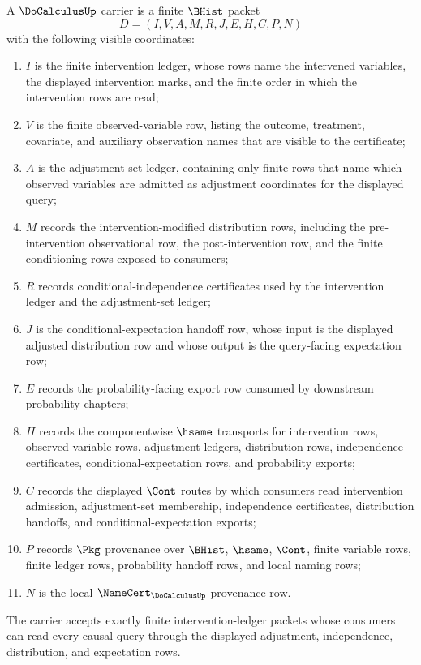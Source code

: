 \begin{definition}
\label{def:do-calculus-carrier}
A $\DoCalculusUp$ carrier is a finite $\BHist$ packet
$$
D=(I,V,A,M,R,J,E,H,C,P,N)
$$
with the following visible coordinates:
\begin{enumerate}
\item $I$ is the finite intervention ledger, whose rows name the intervened
variables, the displayed intervention marks, and the finite order in which the
intervention rows are read;
\item $V$ is the finite observed-variable row, listing the outcome, treatment,
covariate, and auxiliary observation names that are visible to the certificate;
\item $A$ is the adjustment-set ledger, containing only finite rows that name
which observed variables are admitted as adjustment coordinates for the
displayed query;
\item $M$ records the intervention-modified distribution rows, including the
pre-intervention observational row, the post-intervention row, and the finite
conditioning rows exposed to consumers;
\item $R$ records conditional-independence certificates used by the intervention
ledger and the adjustment-set ledger;
\item $J$ is the conditional-expectation handoff row, whose input is the
displayed adjusted distribution row and whose output is the query-facing
expectation row;
\item $E$ records the probability-facing export row consumed by downstream
probability chapters;
\item $H$ records the componentwise $\hsame$ transports for intervention rows,
observed-variable rows, adjustment ledgers, distribution rows, independence
certificates, conditional-expectation rows, and probability exports;
\item $C$ records the displayed $\Cont$ routes by which consumers read
intervention admission, adjustment-set membership, independence certificates,
distribution handoffs, and conditional-expectation exports;
\item $P$ records $\Pkg$ provenance over $\BHist$, $\hsame$, $\Cont$, finite
variable rows, finite ledger rows, probability handoff rows, and local naming
rows;
\item $N$ is the local $\NameCert_{\DoCalculusUp}$ provenance row.
\end{enumerate}
The carrier accepts exactly finite intervention-ledger packets whose consumers
can read every causal query through the displayed adjustment, independence,
distribution, and expectation rows.
\end{definition}

